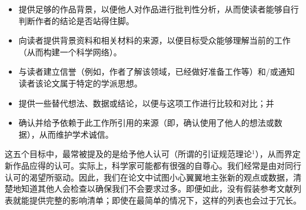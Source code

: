 \begin{itemize}
\item 提供足够的作品背景，以便他人对作品进行批判性分析，从而使读者能够自行判断作者的结论是否站得住脚。
\item 向读者提供背景资料和相关材料的来源，以便目标受众能够理解当前的工作（从而构建一个科学网络）。
\item 与读者建立信誉（例如，作者了解该领域，已经做好准备工作等）和/或通知读者该论文属于特定的学派思想。
\item 提供一些替代想法、数据或结论，以便与这项工作进行比较和对比；并
\item 确认并给予依赖于此工作所引用的来源（即，确认使用了他人的想法或数据），从而维护学术诚信。
\end{itemize}

这五个目标中，最常被提及的是给予他人认可（所谓的引证规范理论${ }^{1}$），从而界定新作品应得的认可。实际上，科学家可能都有很强的自尊心。我们经常是由对同行认可的渴望所驱动。因此，我们在论文中试图小心翼翼地主张新的观点或数据，清楚地知道其他人会检查以确保我们不会要求过多。即便如此，没有假装参考文献列表就能提供完整的影响清单；即使在最简单的情况下，这样的列表也会过于冗长。

